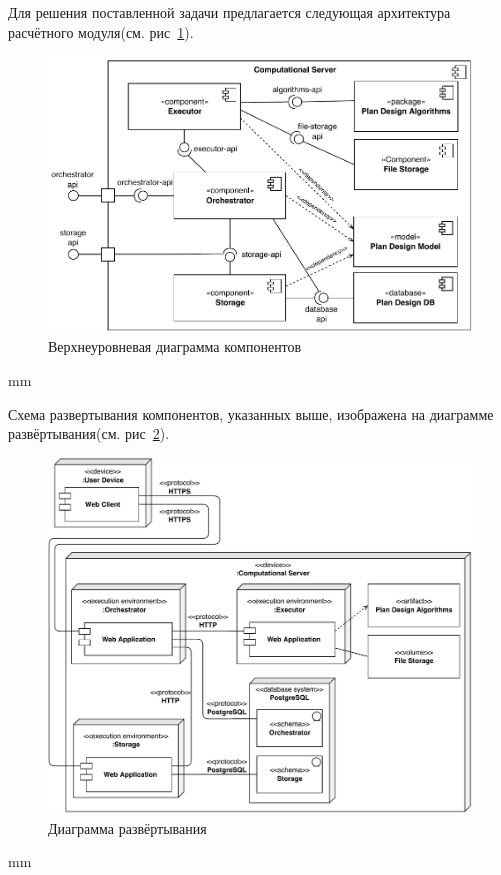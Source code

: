 Для решения поставленной задачи предлагается следующая архитектура расчётного
модуля(см. рис\ \ref{pic:architecture__common-component}).

\begin{figure}[H]
	\includegraphics[width=\textwidth, left]{architecture/pictures/common/component}
	\caption{Верхнеуровневая диаграмма компонентов}
	\label{pic:architecture__common-component}
\end{figure}
 mm

Схема развертывания компонентов, указанных выше, изображена на диаграмме
развёртывания(см. рис\ \ref{pic:architecture__common-deployment}).
\begin{figure}[H]
	\includegraphics[width=\textwidth, left]{architecture/pictures/common/deployment}
	\caption{Диаграмма развёртывания}
	\label{pic:architecture__common-deployment}
\end{figure}
 mm


